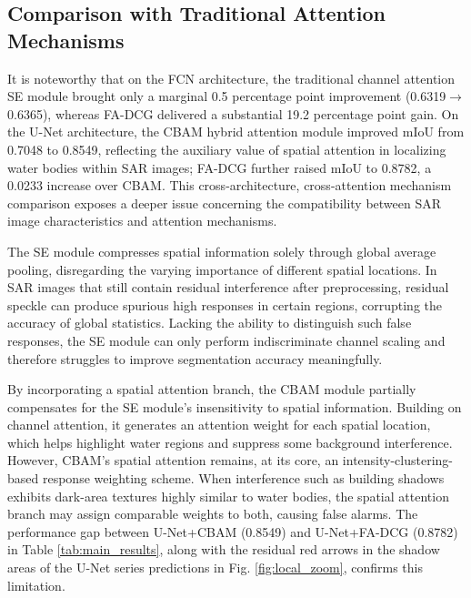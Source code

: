 \documentclass[lettersize,journal]{IEEEtran}
\begin{document}
\subsection{Comparison with Traditional Attention Mechanisms}

It is noteworthy that on the FCN architecture, the traditional channel attention SE module brought only a marginal 0.5 percentage point improvement (0.6319$\rightarrow$0.6365), whereas FA-DCG delivered a substantial 19.2 percentage point gain. On the U-Net architecture, the CBAM hybrid attention module improved mIoU from 0.7048 to 0.8549, reflecting the auxiliary value of spatial attention in localizing water bodies within SAR images; FA-DCG further raised mIoU to 0.8782, a 0.0233 increase over CBAM. This cross-architecture, cross-attention mechanism comparison exposes a deeper issue concerning the compatibility between SAR image characteristics and attention mechanisms.

The SE module compresses spatial information solely through global average pooling, disregarding the varying importance of different spatial locations. In SAR images that still contain residual interference after preprocessing, residual speckle can produce spurious high responses in certain regions, corrupting the accuracy of global statistics. Lacking the ability to distinguish such false responses, the SE module can only perform indiscriminate channel scaling and therefore struggles to improve segmentation accuracy meaningfully.

By incorporating a spatial attention branch, the CBAM module partially compensates for the SE module's insensitivity to spatial information. Building on channel attention, it generates an attention weight for each spatial location, which helps highlight water regions and suppress some background interference. However, CBAM's spatial attention remains, at its core, an intensity-clustering-based response weighting scheme. When interference such as building shadows exhibits dark-area textures highly similar to water bodies, the spatial attention branch may assign comparable weights to both, causing false alarms. The performance gap between U-Net+CBAM (0.8549) and U-Net+FA-DCG (0.8782) in Table \ref{tab:main_results}, along with the residual red arrows in the shadow areas of the U-Net series predictions in Fig. \ref{fig:local_zoom}, confirms this limitation.
\end{document}
